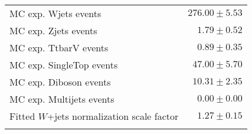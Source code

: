 \begin{table}[h!]
\begin{center}
{\begin{tabular*}{\textwidth}{@{\extracolsep{\fill}}lr}
        MC exp. Wjets events         & $276.00 \pm 5.53$             \\
        MC exp. Zjets events         & $1.79 \pm 0.52$                     \\
        MC exp. TtbarV events         & $0.89 \pm 0.35$                      \\
        MC exp. SingleTop events         & $47.00 \pm 5.70$                   \\
        MC exp. Diboson events         & $10.31 \pm 2.35$                   \\
        MC exp. Multijets events         & $0.00 \pm 0.00$                \\
\noalign{\smallskip}\hline\noalign{\smallskip}
Fitted $W$+jets normalization scale factor & $1.27 \pm 0.15$ \\
\noalign{\smallskip}\hline\noalign{\smallskip}
\end{tabular*}
}
\end{center}
\end{table}
%